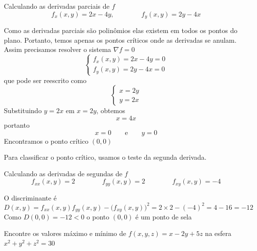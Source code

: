 \documentclass[a4paper,12pt,fleqn]{article}
\begin{document}
\begin{answer}
  Calculando as derivadas parciais de $f$
  \[
    f_x(x, y) = 2x - 4y, \qquad\qquad f_y(x, y) = 2y - 4x
  \]

  Como as derivadas parciais são polinômios elas existem em todos os pontos
  do plano. Portanto, temos apenas os pontos críticos onde as derivadas se anulam.
  Assim precisamos resolver o sistema \(\nabla f = 0\)
  \[
    \begin{cases}
      f_x(x, y) = 2x - 4y = 0 \\
      f_y(x, y) = 2y - 4x = 0
    \end{cases}
  \]
  que pode ser reescrito como
  \[
    \begin{cases}
      x = 2y \\
      y = 2x
    \end{cases}
  \]
  Substituindo \( y = 2x \) em \( x = 2y \), obtemos
  \[
    x = 4x
  \]
  portanto
  \[
    x = 0 \qquad \text{e} \qquad y = 0
  \]
  Encontramos o ponto crítico \((0, 0)\)

  Para classificar o ponto crítico, usamos o teste da segunda derivada.

  Calculando as derivadas de segundas de $f$
  \[
    f_{xx}(x, y) = 2 \qquad\qquad
    f_{yy}(x, y) = 2 \qquad\qquad
    f_{xy}(x, y) = -4
  \]

  O discriminante é
  \[
    D(x, y) = f_{xx}(x, y)f_{yy}(x, y) - \big(f_{xy}(x, y)\big)^2
    = 2 \times 2 - (-4)^2
    = 4 - 16
    = -12
  \]
  Como \(D(0, 0) = -12 <0\) o ponto \((0, 0)\) é um ponto de sela
  \clearpage
\end{answer}

Encontre os valores máximo e mínimo de \(f(x, y, z) = x - 2y + 5z\)
na esfera \(x^2+y^2+z^2=30\)
\end{document}
